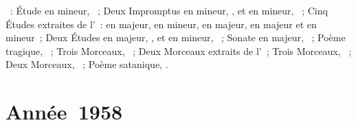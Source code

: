 \begin{description}
 \textsc{\Scriabine{}}~: Étude en \kC \Sharp mineur,  ~;
 Deux Impromptus en \kB \Flat mineur,  , et en \kF \Sharp
 mineur,  ~; Cinq Études extraites de l'~:
  en \kD \Flat majeur,  en \kF \Sharp mineur, 
 en \kF \Sharp majeur,  en \kF \Sharp majeur et  en \kC
 \Sharp mineur~; Deux Études en \kD \Flat majeur,  , et
 en \kB \Flat mineur,  ~; Sonate en \kF \Sharp majeur,
 ~; Poème tragique, ~; Trois Morceaux, ~; Deux
 Morceaux extraits de l'~; Trois Morceaux, ~; Deux
 Morceaux, ~; Poème satanique, .
\end{description}

\section{Année~1958}

